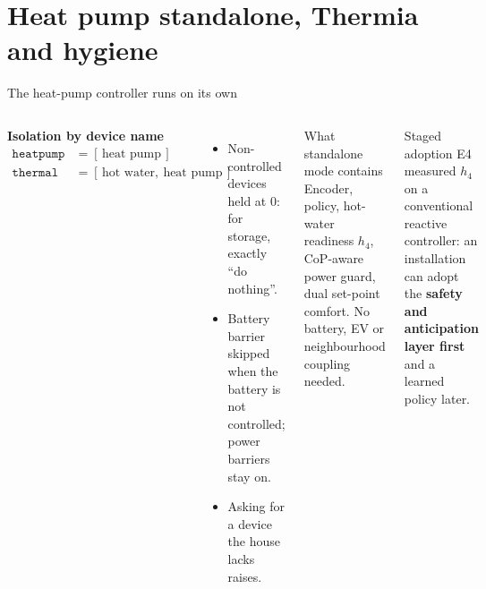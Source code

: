 \documentclass[aspectratio=169,10pt]{beamer}
\begin{document}
\section{Heat pump standalone, Thermia and hygiene}

\begin{frame}{The heat-pump controller runs on its own}
\begin{columns}[T]
\textbf{Isolation by device name}
\begin{align*}
\texttt{heatpump} &= [\,\text{heat pump}\,]\\
\texttt{thermal} &= [\,\text{hot water},\ \text{heat pump}\,]
\end{align*}
\begin{itemize}
  \item Non-controlled devices held at 0: for storage, exactly ``do nothing''.
  \item Battery barrier skipped when the battery is not controlled; power barriers stay on.
  \item Asking for a device the house lacks raises.
\end{itemize}
\begin{block}{What standalone mode contains}
Encoder, policy, hot-water readiness $h_4$, CoP-aware power guard, dual set-point comfort. No battery, EV or neighbourhood coupling needed.
\end{block}
\begin{exampleblock}{Staged adoption}
E4 measured $h_4$ on a conventional reactive controller: an installation can adopt the \textbf{safety and anticipation layer first} and a learned policy later.
\end{exampleblock}
\end{columns}
\end{frame}
\end{document}
